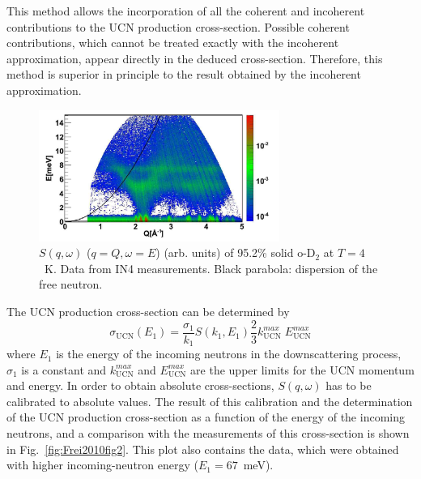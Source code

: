 This method allows the incorporation of all the coherent and
incoherent contributions to the UCN production cross-section. Possible
coherent contributions, which cannot be treated exactly with the
incoherent approximation, appear directly in the deduced
cross-section. Therefore, this method is superior in principle to the
result obtained by the incoherent approximation.

\begin{figure}[h!]
\begin{center}
   \includegraphics[width=0.7\textwidth]{sD2_S.PNG} \caption{\cite{Frei2010}
    $S(q,\omega)$ ($q=Q ,\omega=E$) (arb. units) of 95.2\% solid
    o-D$_2$ at $T=4$~K. Data from IN4 measurements. Black parabola:
    dispersion of the free neutron. }
    \label{fig:sD2_S}
    \end{center}
\end{figure} 



The UCN production cross-section can be determined by
\begin{equation}
\sigma_{\text{UCN}}(E_1)=\frac{\sigma_1}{k_1} S(k_1, E_1) \frac{2}{3} k_{\text{UCN}}^{max} \; E_{\text{UCN}}^{max} 
\end{equation}
where $E_1$ is the energy of the incoming neutrons in the
downscattering process, $\sigma_1$ is a constant and
$k_{\text{UCN}}^{max}$ and $E_{\text{UCN}}^{max} $ are the upper
limits for the UCN momentum and energy.  In order to obtain absolute
cross-sections, $S(q,\omega)$ has to be calibrated to absolute values.
The result of this calibration and the determination of the UCN
production cross-section as a function of the energy of the incoming
neutrons, and a comparison with the measurements of this cross-section
is shown in Fig.~\ref{fig:Frei2010fig2}. This plot also contains the
data, which were obtained with higher incoming-neutron energy
($E_1=67$~meV).


